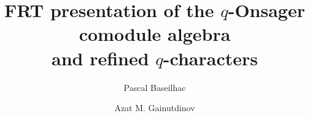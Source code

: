 \documentclass[11pt]{amsart}
\numberwithin{equation}{section}
\numberwithin{equation}{section}
\begin{document}
	
	
	\setcounter{MaxMatrixCols}{30}
	\newcommand{\h}{\frac{1}{2}}
	\newcommand{\tha}{\frac{3}{2}}
	
	\newcommand{\bep}{\overline{\epsilon}_+}
	\newcommand{\bem}{\overline{\epsilon}_-}
	\newcommand{\bkp}{\overline{k}_+}
	\newcommand{\bkm}{\overline{k}_-}
	\newcommand{\kp}{k_+}
	\newcommand{\km}{k_-}
	
	\newcommand{\ds}{\mathds}
	
	\newcommand{\fu}{{\langle 12 \rangle} }
	\newcommand{\futt}{{\langle 23 \rangle} }
	\newcommand{\sfu}{{\langle 34 \rangle} }
	
	\newcommand{\CE}{\cal{E} }
	\newcommand{\CF}{\cal{F} }
	\newcommand{\CH}{\cal{H} }
	\newcommand{\CW}{\cal{W}}
	
	\allowdisplaybreaks
	
		
	\makeatletter
	\def\@textbottom{\vskip \z@ \@plus 1pt}
	\let\@texttop\relax
	\makeatother
	
	
	
	
	\title[FRT presentation of the $q$-Onsager algebra]{FRT presentation of the $q$-Onsager comodule algebra\\ and refined $q$-characters} 
		\author{Pascal Baseilhac}
	\author{Azat M. Gainutdinov}
	\address{Universit\'e de Tours, CNRS, Université d'Orl\'eans, IDP UMR 7013, 37200 Tours, FRANCE}
	
\end{document}
